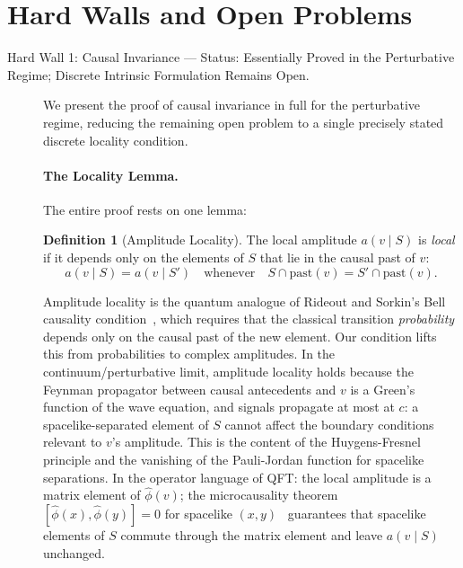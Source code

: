 \documentclass[11pt,a4paper]{article}
\theoremstyle{plain}
\theoremstyle{definition}
\newtheorem{definition}[theorem]{Definition}
\theoremstyle{remark}
\begin{document}
\section{Hard Walls and Open Problems}
\label{sec:hardwalls}

\begin{description}
  \item[Hard Wall 1: Causal Invariance --- Status: Essentially Proved in the
  Perturbative Regime; Discrete Intrinsic Formulation Remains Open.]

  We present the proof of causal invariance in full for the perturbative
  regime, reducing the remaining open problem to a single precisely stated
  discrete locality condition.

  \paragraph{The Locality Lemma.}
  The entire proof rests on one lemma:

  \begin{definition}[Amplitude Locality]
  The local amplitude $a(v \mid S)$ is \emph{local} if it depends only on
  the elements of $S$ that lie in the causal past of $v$:
  \begin{equation}
    a(v \mid S) = a(v \mid S') \quad\text{whenever}\quad
    S \cap \mathrm{past}(v) = S' \cap \mathrm{past}(v).
    \label{eq:locality}
  \end{equation}
  \end{definition}

  Amplitude locality is the quantum analogue of Rideout and Sorkin's Bell
  causality condition~\citep{RideoutSorkin2000}, which requires that the
  classical transition \emph{probability} depends only on the causal past of
  the new element. Our condition lifts this from probabilities to complex
  amplitudes. In the continuum/perturbative limit, amplitude locality holds
  because the Feynman propagator between causal antecedents and $v$ is a
  Green's function of the wave equation, and signals propagate at most at $c$:
  a spacelike-separated element of $S$ cannot affect the boundary conditions
  relevant to $v$'s amplitude. This is the content of the Huygens-Fresnel
  principle and the vanishing of the Pauli-Jordan function for spacelike
  separations. In the operator language of QFT: the local amplitude is a
  matrix element of $\hat{\phi}(v)$; the microcausality theorem
  $[\hat{\phi}(x), \hat{\phi}(y)] = 0$ for spacelike $(x,y)$~\citep{Haag1996}
  guarantees that spacelike elements of $S$ commute through the matrix element
  and leave $a(v \mid S)$ unchanged.


\end{description}
\end{document}
